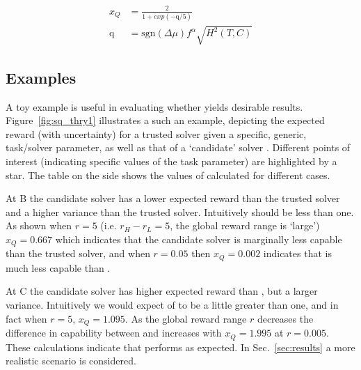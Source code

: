 \begin{align}
    x_{Q} &= \frac{2}{1+exp(-\text{q}/5)}\label{eq:SQ} \\
    \text{q} &= \text{sgn}(\Delta \mu)f^{\alpha}\sqrt{H^{2}(T,C)} \label{eq:q}
\end{align}

\subsection{Examples}
A toy example is useful in evaluating whether \xQ{} yields desirable results. Figure~\ref{fig:sq_thry1} illustrates a such an example, depicting the expected reward (with uncertainty) for a trusted solver \solvestar{} given a specific, generic, task/solver parameter, as well as that of a `candidate' solver \solve. Different points of interest (indicating specific values of the task parameter) are highlighted by a star. The table on the side shows the values of \xQ{} calculated for different cases.

At B the candidate solver has a lower expected reward than the trusted solver and a higher variance than the trusted solver. Intuitively \xQ{} should be less than one. As shown when $r=5$ (i.e. $r_H-r_L=5$, the global reward range is `large') $x_Q=0.667$ which indicates that the candidate solver is marginally less capable than the trusted solver, and when $r=0.05$ then $x_Q=0.002$ indicates that \solve{} is much less capable than \solvestar.

At C the candidate solver \solve{} has higher expected reward than \solvestar, but a larger variance. Intuitively we would expect \xQ{} of \solve{} to be a little greater than one, and in fact when $r=5$, $x_Q=1.095$. As the global reward range $r$ decreases the difference in capability between \solve{} and \solvestar{} increases with $x_Q=1.995$ at $r=0.005$. These calculations indicate that \xQ{} performs as expected. In Sec.~\ref{sec:results} a more realistic scenario is considered. 

